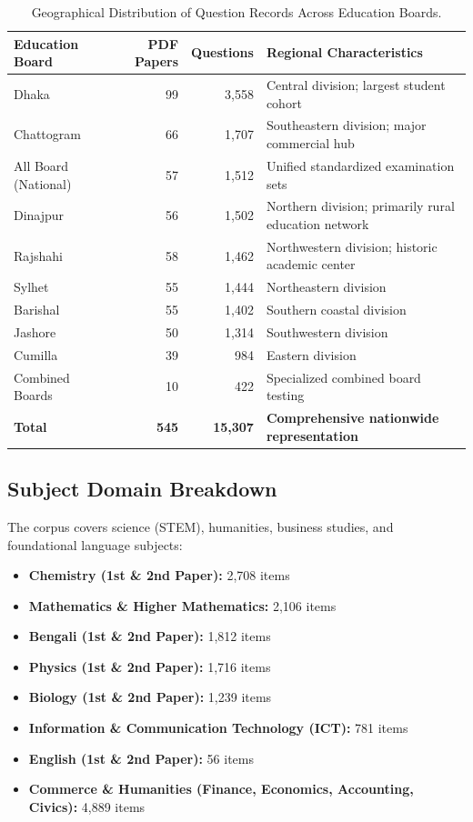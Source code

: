 \documentclass[11pt,a4paper]{article}
\begin{document}
\begin{table}[htbp]
\centering
\small
\caption{Geographical Distribution of Question Records Across Education Boards.}
\label{tab:board_distribution}
\begin{tabular}{lrrp{6.5cm}}
\toprule
\textbf{Education Board} & \textbf{PDF Papers} & \textbf{Questions} & \textbf{Regional Characteristics} \\
\midrule
Dhaka & 99 & 3,558 & Central division; largest student cohort \\
Chattogram & 66 & 1,707 & Southeastern division; major commercial hub \\
All Board (National) & 57 & 1,512 & Unified standardized examination sets \\
Dinajpur & 56 & 1,502 & Northern division; primarily rural education network \\
Rajshahi & 58 & 1,462 & Northwestern division; historic academic center \\
Sylhet & 55 & 1,444 & Northeastern division \\
Barishal & 55 & 1,402 & Southern coastal division \\
Jashore & 50 & 1,314 & Southwestern division \\
Cumilla & 39 & 984 & Eastern division \\
Combined Boards & 10 & 422 & Specialized combined board testing \\
\midrule
\textbf{Total} & \textbf{545} & \textbf{15,307} & \textbf{Comprehensive nationwide representation} \\
\bottomrule
\end{tabular}
\end{table}

\subsection{Subject Domain Breakdown}
The corpus covers science (STEM), humanities, business studies, and foundational language subjects:
\begin{itemize}[noitemsep,topsep=2pt]
    \item \textbf{Chemistry (1st \& 2nd Paper):} 2,708 items
    \item \textbf{Mathematics \& Higher Mathematics:} 2,106 items
    \item \textbf{Bengali (1st \& 2nd Paper):} 1,812 items
    \item \textbf{Physics (1st \& 2nd Paper):} 1,716 items
    \item \textbf{Biology (1st \& 2nd Paper):} 1,239 items
    \item \textbf{Information \& Communication Technology (ICT):} 781 items
    \item \textbf{English (1st \& 2nd Paper):} 56 items
    \item \textbf{Commerce \& Humanities (Finance, Economics, Accounting, Civics):} 4,889 items
\end{itemize}
\end{document}
